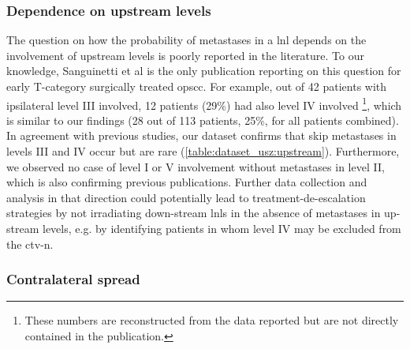 \documentclass[\relativeRoot/main.tex]{subfiles}
\begin{document}
\subsubsection*{Dependence on upstream levels}

The question on how the probability of metastases in a \gls{lnl} depends on the involvement of upstream levels is poorly reported in the literature. To our knowledge, Sanguinetti et al \cite{sanguineti_defining_2009} is the only publication reporting on this question for early T-category surgically treated \gls{opscc}. For example, out of 42 patients with ipsilateral level III involved, 12 patients (29\%) had also level IV involved \footnote{These numbers are reconstructed from the data reported but are not directly contained in the publication.
}, which is similar to our findings (28 out of 113 patients, 25\%, for all patients combined). In agreement with previous studies, our dataset confirms that skip metastases in levels III and IV occur but are rare (\cref{table:dataset_usz:upstream}). Furthermore, we observed no case of level I or V involvement without metastases in level II, which is also confirming previous publications. Further data collection and analysis in that direction could potentially lead to treatment-de-escalation strategies by not irradiating down-stream \glspl{lnl} in the absence of metastases in up-stream levels, e.g. by identifying patients in whom level IV may be excluded from the \gls{ctv-n}.

\subsubsection*{Contralateral spread}
\end{document}

